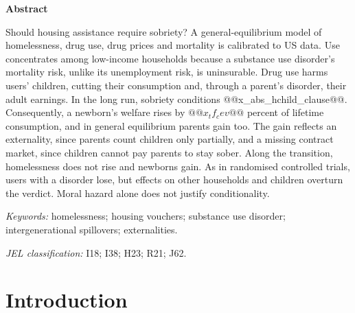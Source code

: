 \documentclass[10pt]{article}
\makeatletter
\newif\ifshowupdates \showupdatesfalse
\newcommand{\listofupdates}{\ifshowupdates\par\noindent{\color{blue}\textbf{Pending updates from the new simulations}}\par
  {\small\@starttoc{upd}}\fi}
\newcommand{\listofwhys}{\ifshowupdates\par\noindent{\color{whygreen}\textbf{Notes on this round's changes}}\par
  {\small\@starttoc{why}}\fi}
\makeatother
\begin{document}
\vspace{0.4em}
\begin{center}
\begin{minipage}{0.86\textwidth}
\begin{center}\textbf{Abstract}\end{center}
\noindent Should housing assistance require sobriety? A general-equilibrium model of homelessness, drug use, drug prices and mortality is calibrated to US data. Use concentrates among low-income households because a substance use disorder's mortality risk, unlike its unemployment risk, is uninsurable. Drug use harms users' children, cutting their consumption and, through a parent's disorder, their adult earnings. In the long run, sobriety conditions @@x_abs_hchild_clause@@. Consequently, a newborn's welfare rises by $@@x_tf_cev@@$ percent of lifetime consumption,  and in general equilibrium parents gain too.  The gain reflects an externality, since parents count children only partially, and a missing contract market, since children cannot pay parents to stay sober. Along the transition, homelessness does not rise and newborns gain. As in randomised controlled trials, users with a disorder lose, but effects on other households and children overturn the verdict. Moral hazard alone does not justify conditionality.

\vspace{0.6em}
\noindent\textit{Keywords:} homelessness; housing vouchers; substance
use disorder; intergenerational spillovers; externalities.

\vspace{0.2em}
\noindent\textit{JEL classification:} I18; I38; H23; R21; J62.
\end{minipage}
\end{center}

\vspace{0.8em}


\listofupdates

\listofwhys

\section{Introduction}\label{sec:intro}
\end{document}
